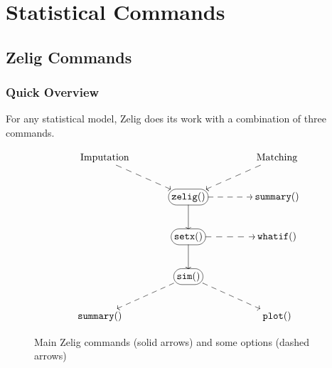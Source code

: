\chapter{Statistical Commands}

\section{Zelig Commands}\label{s:commands}
  
\subsection{Quick Overview}\label{overview}
  
For any statistical model, Zelig does its work with a combination of
three commands.  

\begin{figure}[h!]
\caption{Main Zelig commands (solid arrows) and some options (dashed arrows)}
\label{3steps}
\begin{center}
\begin{displaymath}
\SelectTips{eu}{12} \UseTips 
\xymatrix@!C{\quad {\rm Imputation}
\ar@{-->}[dr] & & {\rm Matching} \ar@{-->}[dl] \\ 
 & *+[F-:<10pt>]{{\tt zelig()}} \ar@{->}[d] \ar@{-->}[r] &
{\tt summary()}\\ 
 & *+[F-:<10pt>]{{\tt setx()}}  \ar@{-->}[r] \ar@{->}[d] & {\tt whatif()}\\ 
& *+[F-:<10pt>]{{\tt sim()}} \ar@{-->}[dr] \ar@{-->}[dl] & \\
{\tt summary()} & &{\tt plot()} } 
\end{displaymath}
\end{center}
\end{figure}

